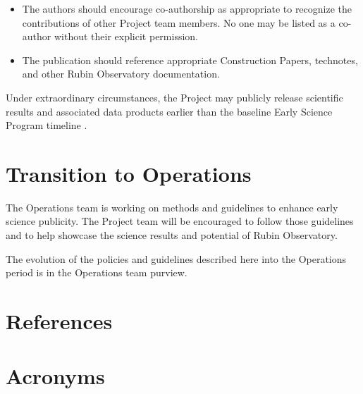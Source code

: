 \documentclass[SE,authoryear,toc]{lsstdoc}
\begin{document}
\begin{itemize}
  \item The authors should encourage co-authorship as appropriate to recognize the contributions of other Project team members.
  No one may be listed as a co-author without their explicit permission.

  \item The publication should reference appropriate Construction Papers, technotes, and other Rubin Observatory documentation.

\end{itemize}

Under extraordinary circumstances, the Project may publicly release scientific results and associated data products earlier than the baseline Early Science Program timeline .

\section{Transition to Operations}
\label{operations}

The Operations team is working on methods and guidelines to enhance early science publicity.
The Project team will be encouraged to follow those guidelines and to help showcase the science results and potential of Rubin Observatory.

The evolution of the policies and guidelines described here into the Operations period is in the Operations team purview.


\appendix
\section{References} \label{sec:bib}
\renewcommand{\refname}{} %


\section{Acronyms} \label{sec:acronyms}

\end{document}

